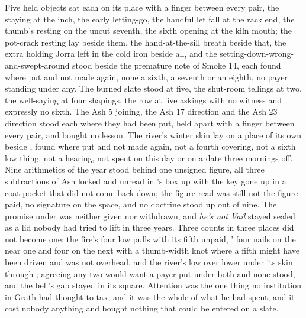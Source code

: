 Five held objects sat each on its place with a finger between every pair, the staying at the inch, the early letting-go, the handful let fall at the rack end, the thumb's resting on the uncut seventh, the sixth opening at the kiln mouth; the pot-crack resting lay beside them, the hand-at-the-sill breath beside that, the extra holding Jorra left in the cold iron beside all, and the setting-down-wrong-and-swept-around stood beside the premature note of Smoke 14, each found where put and not made again, none a sixth, a seventh or an eighth, no payer standing under any. The burned slate stood at five, the shut-room tellings at two, the well-saying at four shapings, the row at five askings with no witness and expressly no sixth. The Ash 5 joining, the Ash 17 direction and the Ash 23 direction stood each where they had been put, held apart with a finger between every pair, and bought no lesson. The river's winter skin lay on a place of its own beside , found where put and not made again, not a fourth covering, not a sixth low thing, not a hearing, not spent on this day or on a date three mornings off. Nine arithmetics of the year stood behind one unsigned figure, all three subtractions of Ash locked and unread in 's box up  with the key gone up in a coat pocket that did not come back down; the figure read was still not the figure paid, no signature on the space, and no doctrine stood up out of nine. The promise under  was neither given nor withdrawn, and \emph{he's not Vail} stayed sealed as a lid nobody had tried to lift in three years. Three counts in three places did not become one: the fire's four low pulls with its fifth unpaid, ' four nails on the near one and four on the next with a thumb-width knot where a fifth might have been driven and was not overhead, and the river's low over lower under its skin through ; agreeing any two would want a payer put under both and none stood, and the bell's gap stayed in its square. Attention was the one thing no institution in Grath had thought to tax, and it was the whole of what he had spent, and it cost nobody anything and bought nothing that could be entered on a slate.

\scenebreak

